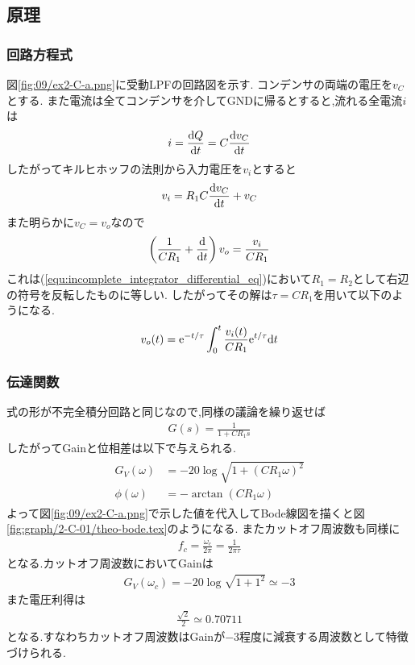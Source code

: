 \subsection{原理}
\subsubsection{回路方程式}
図\ref{fig:09/ex2-C-a.png}に受動LPFの回路図を示す.
コンデンサの両端の電圧を$v_C$とする.
また電流は全てコンデンサを介してGNDに帰るとすると,流れる全電流$i$は
\begin{align}
  i=\frac{{\rm d}Q}{{\rm d}t}=C\frac{{\rm d}v_C}{{\rm d}t}
\end{align}
したがってキルヒホッフの法則から入力電圧を$v_i$とすると
\begin{align}
  v_i=R_1C\frac{{\rm d}v_C}{{\rm d}t}+v_C
\end{align}
また明らかに$v_C=v_o$なので
\begin{align}
  \left(\frac{1}{CR_1}+\frac{{\rm d}}{{\rm d}t}\right)v_o=\frac{v_i}{CR_1}
\end{align}
これは(\ref{equ:incomplete_integrator_differential_eq})において$R_1=R_2$として右辺の符号を反転したものに等しい.
したがってその解は$\tau=CR_1$を用いて以下のようになる.
\begin{align}
  v_o(t)={\rm e}^{-t/\tau}\int^t_0\frac{v_i(t)}{CR_1}{\rm e}^{t/\tau}{\rm d}t
\end{align}
\subsubsection{伝達関数}
式の形が不完全積分回路と同じなので,同様の議論を繰り返せば
\begin{align}
  G(s)=\frac{1}{1+CR_1s}
\end{align}
したがってGainと位相差は以下で与えられる.
\begin{align}
  \begin{split}
    G_V(\omega)&=-20\log\sqrt{1+(CR_1\omega)^2}\\
    \phi(\omega)&=-\arctan(CR_1\omega)
  \end{split}
\end{align}
よって図\ref{fig:09/ex2-C-a.png}で示した値を代入してBode線図を描くと図\ref{fig:graph/2-C-01/theo-bode.tex}のようになる.
またカットオフ周波数も同様に
\begin{align}
  f_c=\frac{\omega_c}{2\pi}=\frac{1}{2\pi\tau}
\end{align}
となる.カットオフ周波数においてGainは
\begin{align}
  G_V(\omega_c)=-20\log\sqrt{1+1^2}\simeq-3
\end{align}
また電圧利得は
\begin{align}
  \frac{\sqrt{2}}{2}\simeq0.70711
\end{align}
となる.すなわちカットオフ周波数はGainが$-3$程度に減衰する周波数として特徴づけられる.
